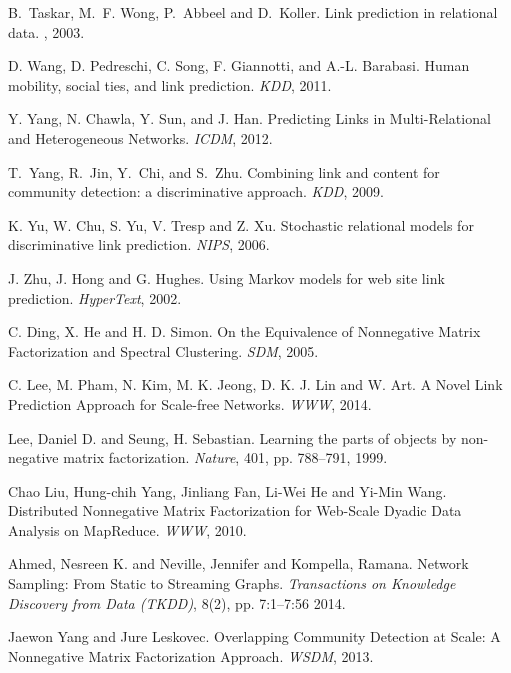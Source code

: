 \documentclass[10pt,journal,compsoc]{IEEEtran}
\begin{document}
\begin{thebibliography}{1}
B.~Taskar, M.~F. Wong, P.~Abbeel and D.~Koller.
\newblock  Link prediction in relational data.
, 2003.



 D. Wang, D. Pedreschi, C. Song, F. Giannotti, and A.-L.
Barabasi.   Human mobility, social ties, and link prediction. {\em
KDD}, 2011.


 Y. Yang, N. Chawla, Y.  Sun, and J. Han. Predicting Links in
Multi-Relational and Heterogeneous Networks. {\em ICDM}, 2012.

T.~Yang, R.~Jin, Y.~Chi, and S.~Zhu.
  Combining link and content for community detection: a discriminative
  approach.
 {\em KDD}, 2009.

K. Yu, W. Chu,  S. Yu,  V.  Tresp and Z. Xu. Stochastic
relational models for discriminative link prediction. {\em NIPS}, 2006.



J. Zhu, J. Hong and G. Hughes.  Using Markov models for web site
link prediction. {\em  HyperText}, 2002.


C. Ding, X. He and H. D. Simon. On the Equivalence of Nonnegative
Matrix Factorization and Spectral Clustering. {\em SDM}, 2005.


C. Lee, M. Pham, N. Kim, M. K. Jeong, D. K. J. Lin and W. Art. A
Novel Link Prediction Approach for Scale-free Networks. {\em WWW}, 2014.

Lee, Daniel D. and Seung, H. Sebastian. Learning the parts of objects by non-negative matrix factorization. {\em Nature},  401, pp. 788--791, 1999.

Chao Liu, Hung-chih Yang, Jinliang Fan, Li-Wei He and Yi-Min Wang.
{Distributed Nonnegative Matrix Factorization for Web-Scale Dyadic Data Analysis on MapReduce}.
{\em WWW}, 2010.


Ahmed, Nesreen K. and Neville, Jennifer and Kompella, Ramana. Network Sampling: From Static to Streaming Graphs. {\em Transactions on Knowledge Discovery from Data (TKDD)}, 8(2), pp. 7:1--7:56 2014.

Jaewon Yang and Jure Leskovec. Overlapping Community Detection at Scale: A Nonnegative Matrix
Factorization Approach. {\em WSDM}, 2013.


\end{thebibliography}
\end{document}
